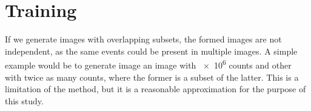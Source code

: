 




\section{Training}

If we generate images with overlapping subsets, the formed images are not independent, as the same events could be present in multiple images. A simple example would be to generate image an image with \num{e6} counts and other with twice as many counts, where the former is a subset of the latter. This is a limitation of the method, but it is a reasonable approximation for the purpose of this study.

